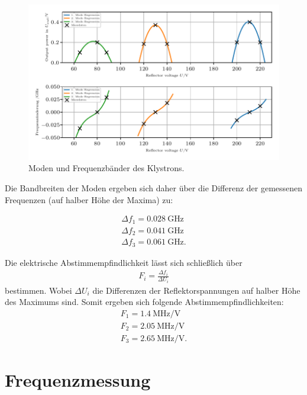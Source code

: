 \begin{figure}
    \centering
    \includegraphics[scale=1]{content/V53_pictures/messung1.pdf}
    \caption{Moden und Frequenzbänder des Klystrons.}
    \label{fig:moden}
\end{figure}

Die Bandbreiten der Moden ergeben sich daher über die Differenz der gemessenen Frequenzen (auf halber Höhe der Maxima) zu:

\begin{align*}
    \Delta f_1 = \qty{0,028}{\giga\hertz} \\
    \Delta f_2 = \qty{0,041}{\giga\hertz} \\
    \Delta f_3 = \qty{0,061}{\giga\hertz}.
\end{align*}

Die elektrische Abstimmempfindlichkeit lässt sich schließlich über 
\begin{align*}
    F_i = \frac{\Delta f_i}{\Delta U_i}
\end{align*}
bestimmen. Wobei $\Delta U_i$ die Differenzen der Reflektorspannungen auf halber Höhe des Maximums sind. Somit ergeben sich folgende Abstimmempfindlichkeiten:\\
\begin{align*}
     F_1 = \qty{1,4}{\mega\hertz\per\volt}\\
     F_2 = \qty{2,05}{\mega\hertz\per\volt}\\
     F_3 = \qty{2,65}{\mega\hertz\per\volt}.
\end{align*}

\section{Frequenzmessung}

